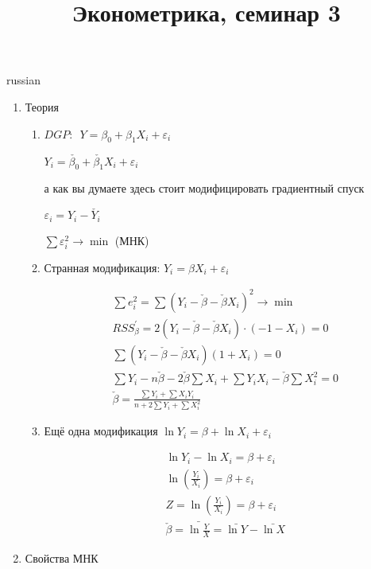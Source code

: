 \documentclass{article}
\begin{document}
\title{\foreignlanguage{russian}{Эконометрика, семинар 3}}
\maketitle
\begin{otherlanguage*}{russian}
\begin{enumerate}
\item Теория

\begin{enumerate}
\item $DGP:\,\,\, Y = \beta_0  + \beta_1 X_i + \varepsilon_i $ 

$ Y_i = \check{\beta_0} + \check{\beta_1} X_i + \varepsilon_i $

а как вы думаете здесь стоит модифицировать градиентный спуск

$ \varepsilon_i = Y_i - \check{Y_i} $

$ \sum \varepsilon_i^2 \rightarrow \min $ (МНК) 

\item Странная модификация: $ Y_i = \beta X_i + \varepsilon_i $

\begin{align}
\sum e_i^2 = \sum (Y_i - \check{\beta} - \check{\beta} X_i)^ 2 \rightarrow \min \\ 
RSS^{'}_\beta = 2(Y_i - \check{\beta} - \check{\beta} X_i) \cdot (-1 - X_i) = 0 \\
\sum (Y_i - \check{\beta} - \check{\beta} X_i)(1 + X_i) = 0\\
\sum Y_i - n \check{\beta} - 2 \check{\beta} \sum X_i + \sum Y_i X_i - \check{\beta} \sum X_i^2 = 0 \\ 
\check{\beta}  = \frac{\sum Y_i + \sum X_i Y_i }{n + 2 \sum Y_i + \sum X_i^2 }
\end{align}

\item Ещё одна модификация $ \ln Y_i = \beta + \ln X_i + \varepsilon_i $

\begin{align}
\ln Y_i - \ln X_i = \beta + \varepsilon_i \\
\ln (\frac{Y_i}{X_i}) = \beta + \varepsilon_i \\
Z = \ln (\frac{Y_i}{X_i}) = \beta + \varepsilon_i \\
\check{\beta} = \bar{\ln \frac{Y}{X}} = \bar{\ln Y} - \bar{\ln X}
\end{align}
\end{enumerate}
\item Свойства МНК


\end{enumerate}
\end{otherlanguage*}
\end{document}
